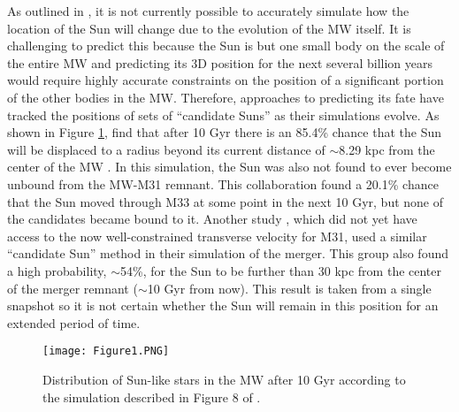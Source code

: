 \documentclass{aastex63}
\begin{document}
As outlined in \cite{2012ApJ...753....9V}, it is not currently possible to accurately simulate how the location of the Sun will change due to the evolution of the MW itself. It is challenging to predict this because the Sun is but one small body on the scale of the entire MW and predicting its 3D position for the next several billion years would require highly accurate constraints on the position of a significant portion of the other bodies in the MW. Therefore, approaches to predicting its fate have tracked the positions of sets of ``candidate Suns'' as their simulations evolve. As shown in Figure \ref{fig:histogram}, \cite{2012ApJ...753....9V} find that after 10 Gyr there is an 85.4\% chance that the Sun will be displaced to a radius beyond its current distance of $\sim$8.29 kpc from the center of the MW . In this simulation, the Sun was also not found to ever become unbound from the MW-M31 remnant. This collaboration found a 20.1\% chance that the Sun moved through M33 at some point in the next 10 Gyr, but none of the candidates became bound to it. Another study \citep{2008MNRAS.386..461C}, which did not yet have access to the now well-constrained transverse velocity for M31, used a similar ``candidate Sun'' method in their simulation of the merger. This group also found a high probability, $\sim$54\%, for the Sun to be further than 30 kpc from the center of the merger remnant ($\sim$10 Gyr from now). This result is taken from a single snapshot so it is not certain whether the Sun will remain in this position for an extended period of time.

\begin{figure}
    \centering
    \texttt{[image: Figure1.PNG]}
    \caption{Distribution of Sun-like stars in the MW after 10 Gyr according to the simulation described in Figure 8 of \cite{2012ApJ...753....9V}.}
    \label{fig:histogram}
\end{figure}
\end{document}
